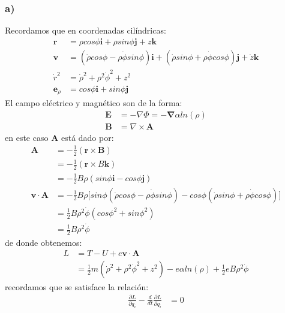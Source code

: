 \documentclass{article}
\begin{document}
\begin{tcolorbox}[breakable]
    \subsubsection*{a)}
    Recordamos que en coordenadas cilíndricas:
    \begin{align*}
        \bm{r} &= \rho cos\phi \bm{i} + \rho sin\phi\bm{j} + z\bm{k} \\
        \bm{v} 
        &=(\dot{\rho} cos\phi - \rho \dot{\phi}sin\phi) \bm{i} 
        + (\dot{\rho}sin\phi + \rho \dot{\phi}cos\phi) \bm{j} 
        + \dot{z}\bm{k} \\
        \dot{r}^2 &= \dot{\rho}^2 + \rho^2\dot{\phi}^2 + z^2 \\ 
        \bm{e}_\rho &= cos\phi \bm{i} + sin\phi \bm{j} 
    \end{align*}
    El campo eléctrico y magnético son de la forma:
    \begin{align*}
        \bm{E} &= -\nabla \Phi = -\bm{\nabla} \alpha ln(\rho) \\ 
        \bm{B} &= \nabla \times \bm{A} 
    \end{align*}
    en este caso $\bm{A}$ está dado por:
    \begin{align*}
        \bm{A} 
        &= -\frac{1}{2}(\bm{r} \times \bm{B}) \\
        &= -\frac{1}{2}(\bm{r} \times B\bm{k}) \\
        &= -\frac{1}{2}B\rho(sin\phi \bm{i} - cos\phi \bm{j}) \\
        \bm{v} \cdot \bm{A} 
        &= -\frac{1}{2}B\rho 
        \bigg[ sin\phi (\dot{\rho} cos\phi - \rho \dot{\phi}sin\phi) 
        -cos\phi (\dot{\rho}sin\phi + \rho \dot{\phi}cos\phi) \bigg] \\
        &= \frac{1}{2}B\rho^2 \dot{\phi}(cos\phi^2 + sin\phi^2) \\
        &= \frac{1}{2}B\rho^2 \dot{\phi} 
    \end{align*}
    de donde obtenemos:
    \begin{align*}
        L 
        &= T - U + e\bm{v} \cdot \bm{A} \\
        &= \frac{1}{2}m(\dot{\rho}^2 + \rho^2\dot{\phi}^2 + z^2) - e\alpha ln(\rho) + \frac{1}{2}eB\rho^2 \dot{\phi}
    \end{align*}
    recordamos que se satisface la relación:
    \begin{align*}
        \frac{\partial L}{\partial q_i} - \frac{d}{dt}\frac{\partial L}{\partial \dot{q}_i} &= 0

\end{align*}
\end{tcolorbox}
\end{document}
